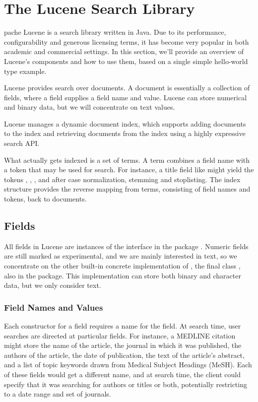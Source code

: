 \chapter{The Lucene Search Library}\label{chap:lucene}

pache Lucene is a search library written in Java.  Due to
its performance, configurability and generous licensing terms, it has
become very popular in both academic and commercial settings.  In this
section, we'll provide an overview of Lucene's components and how to
use them, based on a single simple hello-world type example.  

Lucene provides search over documents.  A document is essentially a
collection of fields, where a field supplies a field name and value.
Lucene can store numerical and binary data, but we will concentrate
on text values.

Lucene manages a dynamic document index, which supports adding
documents to the index and retrieving documents from the index using a
highly expressive search API.  

What actually gets indexed is a set of terms.  A term combines a field
name with a token that may be used for search.  For instance, a title
field like  might yield
the tokens , ,
, and  after case
normalization, stemming and stoplisting.  The index structure provides
the reverse mapping from terms, consisting of field names and tokens,
back to documents.


\section{Fields}

All fields in Lucene are instances of the  interface
in the package .  Numeric fields are
still marked as experimental, and we are mainly interested in text, so
we concentrate on the other built-in concrete implementation of
, the final class , also in the
 package.  This implementation can store both binary
and character data, but we only consider text.

\subsection{Field Names and Values}

Each constructor for a field requires a name for the field.  At search
time, user searches are directed at particular fields.  For instance,
a MEDLINE citation might store the name of the article, the journal in
which it was published, the authors of the article, the date of
publication, the text of the article's abstract, and a list of topic
keywords drawn from Medical Subject Headings (MeSH).  Each of these
fields would get a different name, and at search time, the client
could specify that it was searching for authors or titles or both,
potentially restricting to a date range and set of journals.

